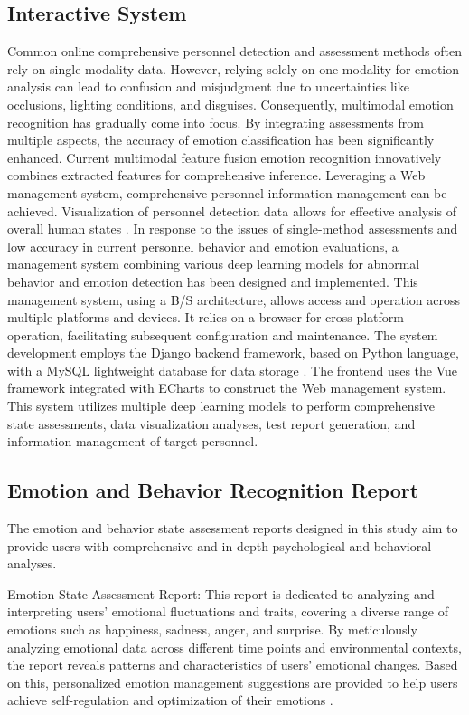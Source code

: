 \documentclass[preprint,12pt]{elsarticle}
\begin{document}
\subsection{Interactive System}

Common online comprehensive personnel detection and assessment methods often rely on single-modality data. However, relying solely on one modality for emotion analysis can lead to confusion and misjudgment due to uncertainties like occlusions, lighting conditions, and disguises. Consequently, multimodal emotion recognition has gradually come into focus. By integrating assessments from multiple aspects, the accuracy of emotion classification has been significantly enhanced. Current multimodal feature fusion emotion recognition innovatively combines extracted features for comprehensive inference. Leveraging a Web management system, comprehensive personnel information management can be achieved. Visualization of personnel detection data allows for effective analysis of overall human states  \cite{ref60}. In response to the issues of single-method assessments and low accuracy in current personnel behavior and emotion evaluations, a management system combining various deep learning models for abnormal behavior and emotion detection has been designed and implemented. This management system, using a B/S architecture, allows access and operation across multiple platforms and devices. It relies on a browser for cross-platform operation, facilitating subsequent configuration and maintenance. The system development employs the Django backend framework, based on Python language, with a MySQL lightweight database for data storage \cite{ref47, ref48}. The frontend uses the Vue framework integrated with ECharts to construct the Web management system. This system utilizes multiple deep learning models to perform comprehensive state assessments, data visualization analyses, test report generation, and information management of target personnel.

\subsection{Emotion and Behavior Recognition Report}

The emotion and behavior state assessment reports designed in this study aim to provide users with comprehensive and in-depth psychological and behavioral analyses.

Emotion State Assessment Report: This report is dedicated to analyzing and interpreting users' emotional fluctuations and traits, covering a diverse range of emotions such as happiness, sadness, anger, and surprise. By meticulously analyzing emotional data across different time points and environmental contexts, the report reveals patterns and characteristics of users' emotional changes. Based on this, personalized emotion management suggestions are provided to help users achieve self-regulation and optimization of their emotions \cite{ref49}.
\end{document}
